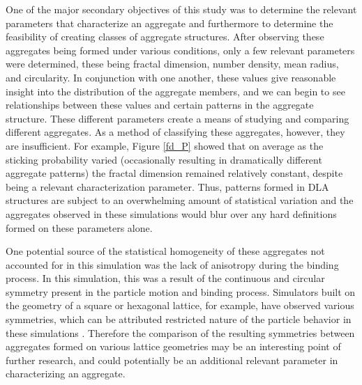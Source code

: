 \documentclass{article}
\begin{document}
One of the major secondary objectives of this study was to determine the relevant parameters that characterize an aggregate and furthermore to determine the feasibility of creating classes of aggregate structures. After observing these aggregates being formed under various conditions, only a few relevant parameters were determined, these being fractal dimension, number density, mean radius, and circularity. In conjunction with one another, these values give reasonable insight into the distribution of the aggregate members, and we can begin to see relationships between these values and certain patterns in the aggregate structure. These different parameters create a means of studying and comparing different aggregates. As a method of classifying these aggregates, however, they are insufficient. For example, Figure \ref{fd_P} showed that on average as the sticking probability varied (occasionally resulting in dramatically different aggregate patterns) the fractal dimension remained relatively constant, despite being a relevant characterization parameter. Thus, patterns formed in DLA structures are subject to an overwhelming amount of statistical variation and the aggregates observed in these simulations would blur over any hard definitions formed on these parameters alone. 

One potential source of the statistical homogeneity of these aggregates not accounted for in this simulation was the lack of anisotropy during the binding process. In this simulation, this was a result of the continuous and circular symmetry present in the particle motion and binding process. Simulators built on the geometry of a square or hexagonal lattice, for example, have observed various symmetries, which can be attributed restricted nature of the particle behavior in these simulations \cite{vic} \cite{goodflake}. Therefore the comparison of the resulting symmetries between aggregates formed on various lattice geometries may be an interesting point of further research, and could potentially be an additional relevant parameter in characterizing an aggregate. 



\pagebreak



\nocite{*}


\end{document}
